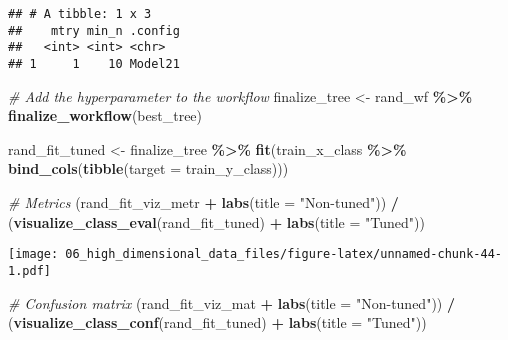 \documentclass[
]{book}
\newenvironment{Shaded}{\begin{snugshade}}{\end{snugshade}}
\newcommand{\CommentTok}[1]{\textcolor[rgb]{0.56,0.35,0.01}{\textit{#1}}}
\newcommand{\DataTypeTok}[1]{\textcolor[rgb]{0.13,0.29,0.53}{#1}}
\newcommand{\KeywordTok}[1]{\textcolor[rgb]{0.13,0.29,0.53}{\textbf{#1}}}
\newcommand{\NormalTok}[1]{#1}
\newcommand{\OperatorTok}[1]{\textcolor[rgb]{0.81,0.36,0.00}{\textbf{#1}}}
\newcommand{\StringTok}[1]{\textcolor[rgb]{0.31,0.60,0.02}{#1}}
\begin{document}
\begin{verbatim}
## # A tibble: 1 x 3
##    mtry min_n .config
##   <int> <int> <chr>  
## 1     1    10 Model21
\end{verbatim}

\begin{Shaded}
\begin{Highlighting}[]
\CommentTok{\# Add the hyperparameter to the workflow }
\NormalTok{finalize\_tree \textless{}{-}}\StringTok{ }\NormalTok{rand\_wf }\OperatorTok{\%\textgreater{}\%}
\StringTok{  }\KeywordTok{finalize\_workflow}\NormalTok{(best\_tree)}
\end{Highlighting}
\end{Shaded}

\begin{Shaded}
\begin{Highlighting}[]
\NormalTok{rand\_fit\_tuned \textless{}{-}}\StringTok{ }\NormalTok{finalize\_tree }\OperatorTok{\%\textgreater{}\%}\StringTok{ }
\StringTok{  }\KeywordTok{fit}\NormalTok{(train\_x\_class }\OperatorTok{\%\textgreater{}\%}\StringTok{ }\KeywordTok{bind\_cols}\NormalTok{(}\KeywordTok{tibble}\NormalTok{(}\DataTypeTok{target =}\NormalTok{ train\_y\_class)))}

\CommentTok{\# Metrics }
\NormalTok{(rand\_fit\_viz\_metr }\OperatorTok{+}\StringTok{ }\KeywordTok{labs}\NormalTok{(}\DataTypeTok{title =} \StringTok{"Non{-}tuned"}\NormalTok{)) }\OperatorTok{/}\StringTok{ }\NormalTok{(}\KeywordTok{visualize\_class\_eval}\NormalTok{(rand\_fit\_tuned) }\OperatorTok{+}\StringTok{ }\KeywordTok{labs}\NormalTok{(}\DataTypeTok{title =} \StringTok{"Tuned"}\NormalTok{))}
\end{Highlighting}
\end{Shaded}

\texttt{[image: 06\_high\_dimensional\_data\_files/figure-latex/unnamed-chunk-44-1.pdf]}

\begin{Shaded}
\begin{Highlighting}[]
\CommentTok{\# Confusion matrix }
\NormalTok{(rand\_fit\_viz\_mat }\OperatorTok{+}\StringTok{ }\KeywordTok{labs}\NormalTok{(}\DataTypeTok{title =} \StringTok{"Non{-}tuned"}\NormalTok{)) }\OperatorTok{/}\StringTok{ }\NormalTok{(}\KeywordTok{visualize\_class\_conf}\NormalTok{(rand\_fit\_tuned) }\OperatorTok{+}\StringTok{ }\KeywordTok{labs}\NormalTok{(}\DataTypeTok{title =} \StringTok{"Tuned"}\NormalTok{))}
\end{Highlighting}
\end{Shaded}
\end{document}
